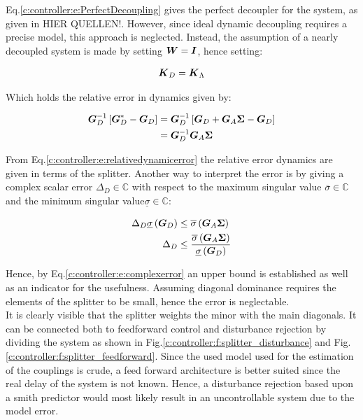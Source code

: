 Eq.\ref{c:controller:e:PerfectDecoupling} gives the perfect decoupler for the system, as given in HIER QUELLEN!. However, since ideal dynamic decoupling requires a precise model, this approach is neglected. Instead, the assumption of a nearly decoupled system is made by setting $\mbox{\boldmath$W$}=\mbox{\boldmath$I$}$, hence setting:

\begin{align}
\mbox{\boldmath$K$}_D = \mbox{\boldmath$K$}_{\Lambda}
\end{align} 

Which holds the relative error in dynamics given by:

\begin{align}
\begin{split}
\mbox{\boldmath$G$}_D^{-1}\left[\mbox{\boldmath$G$}_D^*- \mbox{\boldmath$G$}_D\right] &= \mbox{\boldmath$G$}_D^{-1}\left[\mbox{\boldmath$G$}_D + \mbox{\boldmath$G$}_A \mbox{\boldmath$\Sigma$} - \mbox{\boldmath$G$}_D \right]\\
&= \mbox{\boldmath$G$}_D^{-1}\mbox{\boldmath$G$}_A \mbox{\boldmath$\Sigma$} 
\end{split}
\label{c:controller:e:relativedynamicerror}
\end{align}

From Eq.\ref{c:controller:e:relativedynamicerror} the relative error dynamics are given in terms of the splitter. Another way to interpret the error is by giving a complex scalar error $\Delta_D \in \mathbb{C}$ with respect to the maximum singular value $\overline{\sigma} \in \mathbb{C}$ and the minimum singular value$\underline{\sigma} \in \mathbb{C}$:

\begin{align}
\begin{split}
\Delta_D \underline{\sigma}\left( \mbox{\boldmath$G$}_D \right)  &\leq   \overline{\sigma}\left(\mbox{\boldmath$G$}_A \mbox{\boldmath$\Sigma$} \right)\\
\Delta_D &\leq \frac{\overline{\sigma}\left( \mbox{\boldmath$G$}_A \mbox{\boldmath$\Sigma$} \right) }{\underline{\sigma}\left( \mbox{\boldmath$G$}_D \right)} 
\end{split}
\label{c:controller:e:complexerror}
\end{align}

Hence, by Eq.\ref{c:controller:e:complexerror} an upper bound is established as well as an indicator for the usefulness. Assuming diagonal dominance requires the elements of the splitter to be small, hence the error is neglectable.\\

It is clearly visible that the splitter weights the minor with the main diagonals. It can be connected both to feedforward control and disturbance rejection by dividing the system as shown in Fig.\ref{c:controller:f:splitter_disturbance} and Fig.\ref{c:controller:f:splitter_feedforward}. Since the used model used for the estimation of the couplings is crude, a feed forward architecture is better suited since the real delay of the system is not known. Hence, a disturbance rejection based upon a smith predictor would most likely result in an uncontrollable system due to the model error.\\

